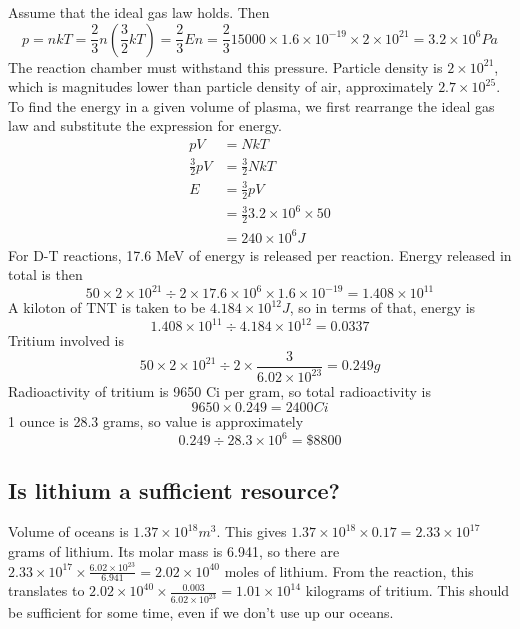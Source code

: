 \documentclass[answers]{exam}
\begin{document}
\begin{questions}
\begin{solution}
    Assume that the ideal gas law holds. Then
    $$p = nkT = \frac{2}{3} n \left(\frac{3}{2}kT\right) = \frac{2}{3} En = \frac{2}{3} 15000 \times 1.6 \times 10^{-19} \times 2 \times 10^{21} = 3.2 \times 10^6 \unit{Pa}$$
    The reaction chamber must withstand this pressure. Particle density is $2\times10^{21}$, which is magnitudes lower than particle density of air, approximately $2.7 \times 10^{25}$. \\
    To find the energy in a given volume of plasma, we first rearrange the ideal gas law and substitute the expression for energy.
    \begin{align*}
        pV &= NkT \\
        \frac{3}{2} pV &= \frac{3}{2} NkT \\
        E &= \frac{3}{2} pV \\
          &= \frac{3}{2} 3.2 \times 10^6 \times 50 \\
          &= 240 \times 10^6 \unit{J}
    \end{align*}
    For D-T reactions, 17.6 MeV of energy is released per reaction. Energy released in total is then
    $$50 \times 2 \times 10^{21} \div 2 \times 17.6 \times 10^6 \times 1.6 \times 10^{-19} = 1.408 \times 10^{11}$$
    A kiloton of TNT is taken to be $4.184 \times 10^{12}\unit{J}$, so in terms of that, energy is
    $$1.408 \times 10^{11} \div 4.184 \times 10^{12} = 0.0337$$
    Tritium involved is
    $$50 \times 2 \times 10^{21} \div 2 \times \frac{3}{6.02 \times 10^{23}} = 0.249 \unit{g}$$
    Radioactivity of tritium is 9650 Ci per gram, so total radioactivity is
    $$9650 \times 0.249 = 2400\unit{Ci}$$
    1 ounce is 28.3 grams, so value is approximately
    $$0.249 \div 28.3 \times 10^6 = \$8800$$
\end{solution}


\begin{parts}

\part{Is lithium a sufficient resource?}

\begin{solution}
    Volume of oceans is $1.37 \times 10^{18} \unit{m^3}$. This gives $1.37 \times 10^{18} \times 0.17 = 2.33 \times 10^{17}$ grams of lithium. Its molar mass is 6.941, so there are $2.33 \times 10^{17} \times \frac{6.02\times10^{23}}{6.941} = 2.02 \times 10^{40}$ moles of lithium. From the reaction, this translates to  $2.02 \times 10^{40} \times \frac{0.003}{6.02\times10^{23}} = 1.01 \times 10^{14}$ kilograms of tritium. This should be sufficient for some time, even if we don't use up our oceans.
\end{solution}


\end{parts}
\end{questions}
\end{document}
